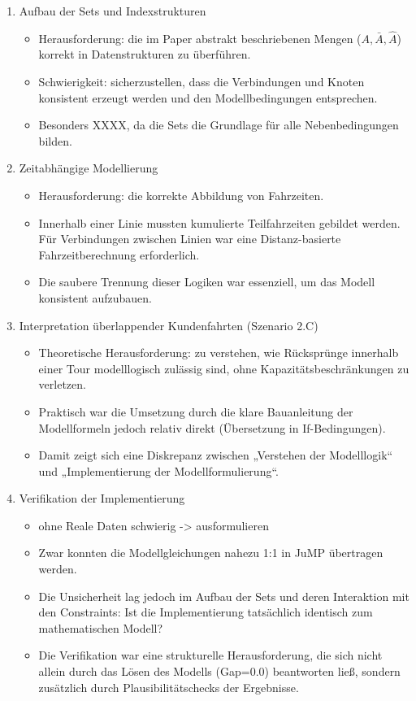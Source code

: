  \begin{enumerate}
    \item Aufbau der Sets und Indexstrukturen
    \begin{itemize}
        \item Herausforderung: die im Paper abstrakt beschriebenen Mengen ($A, \bar{A}, \hat{A}$) korrekt in Datenstrukturen zu überführen.
        \item Schwierigkeit: sicherzustellen, dass die Verbindungen und Knoten konsistent erzeugt werden und den Modellbedingungen entsprechen.
        \item Besonders  XXXX, da die Sets die Grundlage für alle Nebenbedingungen bilden.
    \end{itemize}
    
    \item Zeitabhängige Modellierung
    \begin{itemize}
        \item Herausforderung: die korrekte Abbildung von Fahrzeiten.
        \item Innerhalb einer Linie mussten kumulierte Teilfahrzeiten gebildet werden. Für Verbindungen zwischen Linien war eine Distanz-basierte Fahrzeitberechnung erforderlich.
        \item Die saubere Trennung dieser Logiken war essenziell, um das Modell konsistent aufzubauen.
    \end{itemize}
   
    
    \item Interpretation überlappender Kundenfahrten (Szenario 2.C)
        \begin{itemize}
            \item Theoretische Herausforderung: zu verstehen, wie Rücksprünge innerhalb einer Tour modelllogisch zulässig sind, ohne Kapazitätsbeschränkungen zu verletzen.
            \item Praktisch war die Umsetzung durch die klare Bauanleitung der Modellformeln jedoch relativ direkt (Übersetzung in If-Bedingungen).
            \item Damit zeigt sich eine Diskrepanz zwischen „Verstehen der Modelllogik“ und „Implementierung der Modellformulierung“.
        \end{itemize}
    
    \item  Verifikation der Implementierung
    \begin{itemize}
        \item ohne Reale Daten schwierig -> ausformulieren
        \item Zwar konnten die Modellgleichungen nahezu 1:1 in JuMP übertragen werden.
        \item Die Unsicherheit lag jedoch im Aufbau der Sets und deren Interaktion mit den Constraints: Ist die Implementierung tatsächlich identisch zum mathematischen Modell?
        \item Die Verifikation war eine strukturelle Herausforderung, die sich nicht allein durch das Lösen des Modells (Gap=0.0) beantworten ließ, sondern zusätzlich durch Plausibilitätschecks der Ergebnisse.
    \end{itemize}
    

\end{enumerate}
